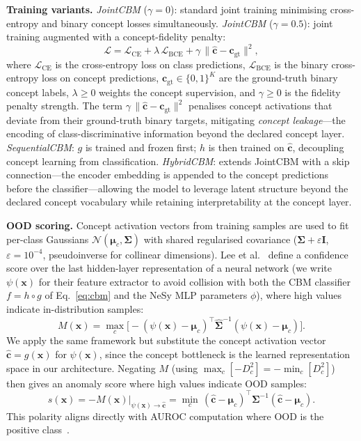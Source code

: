 \documentclass[journal]{IEEEtran}
\begin{document}
\textbf{Training variants.}
\emph{JointCBM} ($\gamma{=}0$): standard joint training minimising
cross-entropy and binary concept losses simultaneously.
\emph{JointCBM} ($\gamma{=}0.5$): joint training augmented with a
concept-fidelity penalty:
\begin{equation}
  \mathcal{L} = \mathcal{L}_{\mathrm{CE}} + \lambda\,\mathcal{L}_{\mathrm{BCE}}
    + \gamma\,\|\hat{\mathbf{c}} - \mathbf{c}_{\text{gt}}\|^2,
  \label{eq:cbm_loss}
\end{equation}
where $\mathcal{L}_{\mathrm{CE}}$ is the cross-entropy loss on class
predictions, $\mathcal{L}_{\mathrm{BCE}}$ is the binary cross-entropy
loss on concept predictions, $\mathbf{c}_{\text{gt}}\in\{0,1\}^K$ are
the ground-truth binary concept labels, $\lambda{\geq}0$ weights the
concept supervision, and $\gamma{\geq}0$ is the fidelity penalty
strength. The term $\gamma\,\|\hat{\mathbf{c}} - \mathbf{c}_{\text{gt}}\|^2$
penalises concept activations that deviate from their ground-truth
binary targets, mitigating \emph{concept leakage}---the encoding of
class-discriminative information beyond the declared concept layer.
\emph{SequentialCBM}: $g$ is trained and frozen first; $h$ is then
trained on $\hat{\mathbf{c}}$, decoupling concept learning from
classification.
\emph{HybridCBM}: extends JointCBM with a skip connection---the
encoder embedding is appended to the concept predictions before the
classifier---allowing the model to leverage latent structure beyond the
declared concept vocabulary while retaining interpretability at the
concept layer.

\textbf{OOD scoring.}
Concept activation vectors from training samples are used to fit
per-class Gaussians $\mathcal{N}(\boldsymbol{\mu}_c,\boldsymbol{\Sigma})$
with shared regularised covariance ($\boldsymbol{\Sigma}+\varepsilon\mathbf{I}$,
$\varepsilon{=}10^{-4}$, pseudoinverse for collinear dimensions).
Lee et al.~\cite{lee2018simple} define a confidence score over the last
hidden-layer representation of a neural network (we write $\psi(\mathbf{x})$
for their feature extractor to avoid collision with both the CBM classifier
$f{=}h\circ g$ of Eq.~\ref{eq:cbm} and the NeSy MLP parameters $\phi$),
where high values indicate in-distribution samples:
\[
  M(\mathbf{x}) = \max_c\bigl[-(\psi(\mathbf{x})-\boldsymbol{\mu}_c)^\top
  \hat{\boldsymbol{\Sigma}}^{-1}(\psi(\mathbf{x})-\boldsymbol{\mu}_c)\bigr].
\]
We apply the same framework but substitute the concept activation vector
$\hat{\mathbf{c}}=g(\mathbf{x})$ for $\psi(\mathbf{x})$, since the concept
bottleneck is the learned representation space in our architecture.
Negating $M$ (using $\max_c[-D^2_c]=-\min_c[D^2_c]$) then gives an anomaly
score where high values indicate OOD samples:
\begin{equation}
  s(\mathbf{x}) = -M(\mathbf{x})\big|_{\psi(\mathbf{x})\to\hat{\mathbf{c}}}
  = \min_c\,(\hat{\mathbf{c}}-\boldsymbol{\mu}_c)^\top
  \boldsymbol{\Sigma}^{-1}(\hat{\mathbf{c}}-\boldsymbol{\mu}_c).
  \label{eq:mahal}
\end{equation}
This polarity aligns directly with AUROC computation where OOD is the positive
class~\cite{fort2021exploring}.
\end{document}
